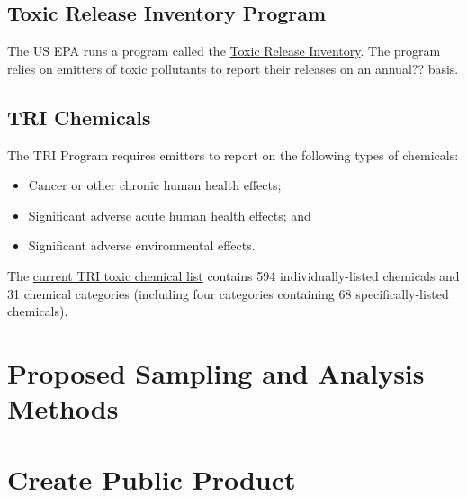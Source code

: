 \documentclass{article}
\begin{document}
\subsection{Toxic Release Inventory Program}

The US EPA runs a program called the \href{https://www.epa.gov/toxics-release-inventory-tri-program}{Toxic Release Inventory}. The program relies on emitters of toxic pollutants to report their releases on an annual?? basis. 

\subsection{TRI Chemicals}

The TRI Program requires emitters to report on the following types of chemicals:

\begin{itemize}
  \item Cancer or other chronic human health effects;
  \item Significant adverse acute human health effects; and
  \item Significant adverse environmental effects.
\end{itemize}

The \href{https://www.epa.gov/sites/production/files/2015-11/tri_chemical_list_for_ry15_11_5_2015_1.xlsx}{current TRI toxic chemical list} contains 594 individually-listed chemicals and 31 chemical categories (including four categories containing 68 specifically-listed chemicals). 

\section{Proposed Sampling and Analysis Methods}


\section{Create Public Product}
\end{document}
